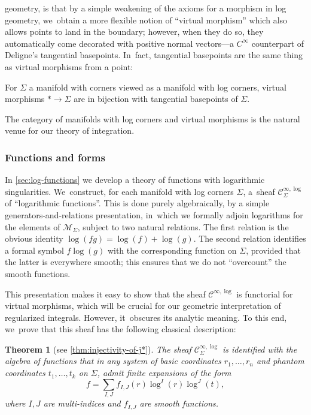 \documentclass[JEP,XML,SOM,Unicode,NoFloatCountersInSection,published]{cedram}
\newtheorem{theorem}{Theorem}[section]
\theoremstyle{definition}
\theoremstyle{remark}
\newcommand{\cM}{\mathscr{M}}
\newcommand{\Cinflog}[1]{\mathscr{C}^{\infty,\log}_{#1}}
\newcommand{\Sig}{\Sigma}
\begin{document}
\noindent
geometry, is that by a simple weakening of the axioms for a morphism in log geometry, we~obtain a more flexible notion of ``virtual morphism'' which also allows points to land in the boundary; however, when they do so, they automatically come decorated with positive normal vectors---a $C^\infty$ counterpart of Deligne's tangential basepoints. In~fact, tangential basepoints are the same thing as virtual morphisms from a point:

\begin{proposition}
For $\Sig$ a manifold with corners viewed as a manifold with log corners, virtual morphisms $*\to \Sig$ are in bijection with tangential basepoints of $\Sig$.
\end{proposition}

The category of manifolds with log corners and virtual morphisms is the natural venue for our theory of integration.

\subsubsection{Functions and forms}

In \autoref{sec:log-functions} we develop a theory of functions with logarithmic singularities. We~construct, for each manifold with log corners $\Sig$, a~sheaf $\Cinflog{\Sig}$ of ``logarithmic functions''. This is done purely algebraically, by a simple generators-and-relations presentation, in~which we formally adjoin logarithms for the elements of $\cM_\Sig$, subject to two natural relations. The first relation is the obvious identity $\log(fg) = \log(f)+\log(g)$. The second relation identifies a formal symbol $f \log(g)$ with the corresponding function on $\Sig$, provided that the latter is everywhere smooth; this ensures that we do not ``overcount'' the smooth functions.

This presentation makes it easy to show that the sheaf $\Cinflog{}$ is functorial for virtual morphisms, which will be crucial for our geometric interpretation of regularized integrals.
However, it~obscures its analytic meaning. To this end, we~prove that this sheaf has the following classical description:
\begin{theorem}[see \autoref{thm:injectivity-of-j*}]\label{thm:log-functions}
The sheaf $\Cinflog{\Sig}$ is identified with the algebra of functions that in any system of basic coordinates $r_1,\ldots,r_n$ and phantom coordinates $t_1,\ldots,t_k$ on $\Sig$, admit finite expansions of the form
\[
f = \sum_{I,J} f_{I,J}(r)\log^I(r) \log^J(t),
\]
where $I,J$ are multi-indices and $f_{I,J}$ are smooth functions.
\end{theorem}
\end{document}
